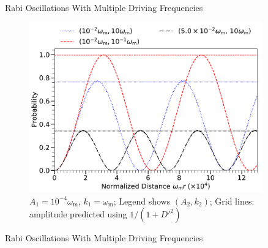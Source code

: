 \documentclass[9pt]{beamer}
\begin{document}
\begin{darkframes}
\begin{frame}{Rabi Oscillations With Multiple Driving Frequencies}
\begin{figure}
\includegraphics[width=0.9\textwidth]{assets/interference-reduction-slide-with-legend}
\caption*{$A_1=10^{-4}\omega_{\mathrm m}$, $k_1= \omega_{\mathrm m}$; Legend shows $(A_2, k_2)$; Grid lines: amplitude predicted using $1/(1+D'^2)$
}
\end{figure}




\end{frame}



\begin{frame}{Rabi Oscillations With Multiple Driving Frequencies}




\end{frame}
\end{darkframes}
\end{document}
